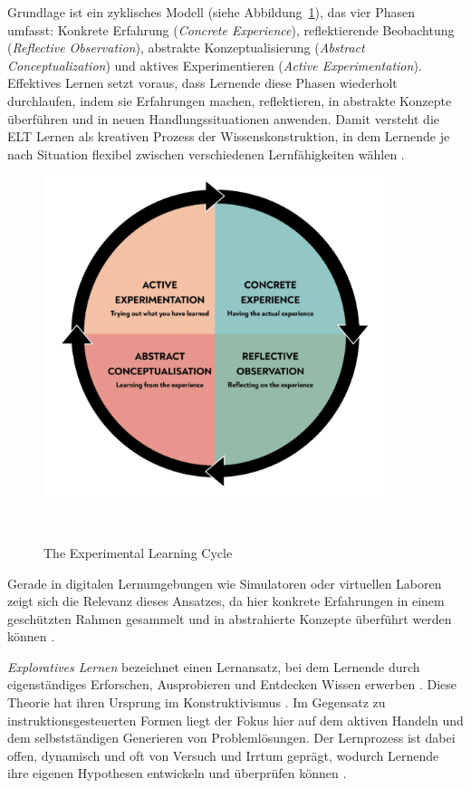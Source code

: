 Grundlage ist ein zyklisches Modell (siehe Abbildung~\ref{fig:etl_cycle}), das vier Phasen umfasst: Konkrete Erfahrung (\textit{Concrete Experience}), reflektierende Beobachtung (\textit{Reflective Observation}), abstrakte Konzeptualisierung (\textit{Abstract Conceptualization}) und aktives Experimentieren (\textit{Active Experimentation}). Effektives Lernen setzt voraus, dass Lernende diese Phasen wiederholt durchlaufen, indem sie Erfahrungen machen, reflektieren, in abstrakte Konzepte überführen und in neuen Handlungssituationen anwenden. Damit versteht die ELT Lernen als kreativen Prozess der Wissenskonstruktion, in dem Lernende je nach Situation flexibel zwischen verschiedenen Lernfähigkeiten wählen \parencite[S.~2f]{mccarthy_experiential_2010}.

\begin{figure}[htbp]
    \centering
    \includegraphics[width=0.90\textwidth]{img/ELT_cycle.png}
    \caption{The Experimental Learning Cycle}~\cite{mcleod_kolbs_2025}
    \label{fig:etl_cycle}
\end{figure}

Gerade in digitalen Lernumgebungen wie Simulatoren oder virtuellen Laboren zeigt sich die Relevanz dieses Ansatzes, da hier konkrete Erfahrungen in einem geschützten Rahmen gesammelt und in abstrahierte Konzepte überführt werden können \parencites[S.~3182]{reyes_enhancing_2024}[S.~7]{bazie_effect_2024}.

\textit{Exploratives Lernen} bezeichnet einen Lernansatz, bei dem Lernende durch eigenständiges Erforschen, Ausprobieren und Entdecken Wissen erwerben \parencite[S.~15]{grabinger_rich_2016}. Diese Theorie hat ihren Ursprung im Konstruktivismus \parencite[S.~271]{kornelsen_expedition_2005}. Im Gegensatz zu instruktionsgesteuerten Formen liegt der Fokus hier auf dem aktiven Handeln und dem selbstständigen Generieren von Problemlösungen. Der Lernprozess ist dabei offen, dynamisch und oft von Versuch und Irrtum geprägt, wodurch Lernende ihre eigenen Hypothesen entwickeln und überprüfen können \parencite[S.~141]{lucke_strukturierte_2005}.

